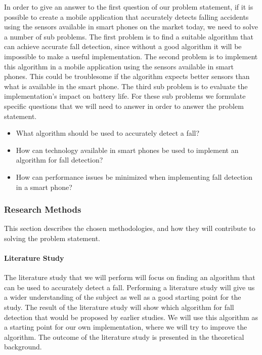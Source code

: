 \documentclass[12pt, a4paper, onecolumn]{article}
\begin{document}
	In order to give an answer to the first question of our problem statement, if it is possible to create a mobile application that accurately detects falling accidents using the sensors available in smart phones on the market today, we need to solve a number of sub problems. The first problem is to find a suitable algorithm that can achieve accurate fall detection, since without a good algorithm it will be impossible to make a useful implementation. The second problem is to implement this algorithm in a mobile application using the sensors available in smart phones. This could be troublesome if the algorithm expects better sensors than what is available in the smart phone. The third sub problem is to evaluate the implementation's impact on battery life. For these sub problems we formulate specific questions that we will need to answer in order to answer the problem statement.
	
	\begin{itemize}
		\item What algorithm should be used to accurately detect a fall?
		\item How can technology available in smart phones be used to implement an algorithm for fall detection?
		\item How can performance issues be minimized when implementing fall detection in a smart phone?
	\end{itemize}
	
	\subsubsection{Research Methods}
	
	This section describes the chosen methodologies, and how they will contribute to solving the problem statement.
	
	\paragraph{Literature Study}
	
	The literature study that we will perform will focus on finding an algorithm that can be used to accurately detect a fall. Performing a literature study will give us a wider understanding of the subject as well as a good starting point for the study. The result of the literature study will show which algorithm for fall detection that would be proposed by earlier studies. We will use this algorithm as a starting point for our own implementation, where we will try to improve the algorithm. The outcome of the literature study is presented in the theoretical background.
	
\end{document}
